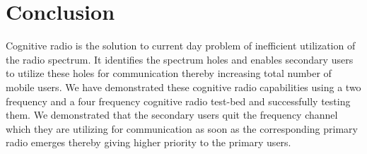 \chapter{Conclusion}

Cognitive radio is the solution to current day problem of inefficient 
utilization of the radio spectrum. It identifies the spectrum holes and 
enables secondary users to utilize these holes for communication thereby 
increasing total number of mobile users. We have demonstrated these cognitive
radio capabilities using a two frequency and a four frequency cognitive radio
test-bed and successfully testing them.  We demonstrated that the secondary 
users quit the frequency channel which they are utilizing for communication
as soon as the corresponding primary radio emerges thereby giving higher
priority to the primary users.